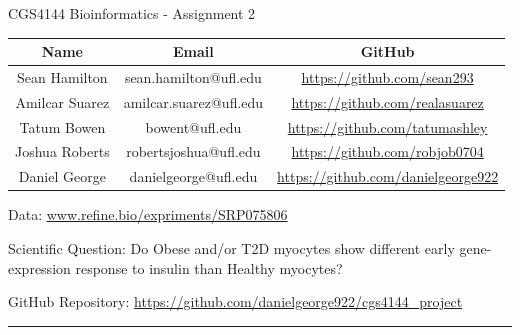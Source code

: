 \documentclass[12pt]{exam}
\begin{document}
 
 CGS4144 Bioinformatics - Assignment 2
 
 \begin{center}
\begin{tabular}{||c c c||} 
 \hline
 Name & Email & GitHub \\ [0.5ex] 
 \hline\hline
 Sean Hamilton & sean.hamilton@ufl.edu & \url{https://github.com/sean293} \\ 
 \hline
 Amilcar Suarez & amilcar.suarez@ufl.edu & \url{https://github.com/realasuarez} \\
 \hline
 Tatum Bowen & bowent@ufl.edu & \url{https://github.com/tatumashley} \\
 \hline
 Joshua Roberts & robertsjoshua@ufl.edu & \url{https://github.com/robjob0704} \\
 \hline
 Daniel George & danielgeorge@ufl.edu & \url{https://github.com/danielgeorge922} \\ [1ex] 
 \hline
\end{tabular}
\end{center}

Data: \href{https://www.refine.bio/experiments/SRP075806/rna-sequencing-of-human-skeletal-myocytes-from-healthy-obese-and-type-2-diabetic-subjects}{www.refine.bio/expriments/SRP075806}

Scientific Question: Do Obese and/or T2D myocytes show different early gene-expression response to insulin than Healthy myocytes?

GitHub Repository: \url{https://github.com/danielgeorge922/cgs4144_project}

\noindent\rule{\textwidth}{1pt}
\end{document}
